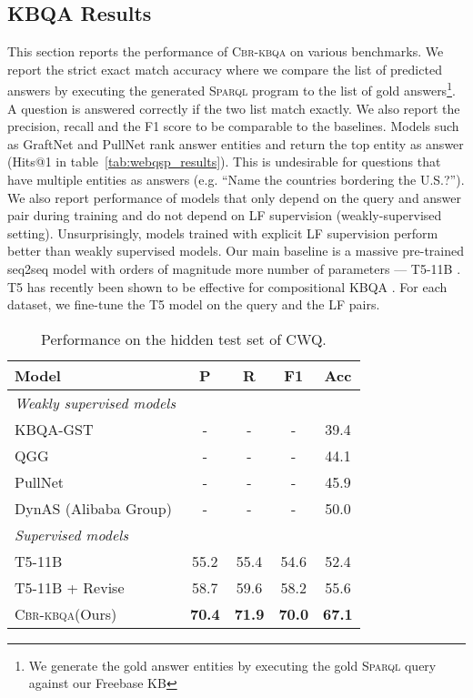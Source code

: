 \documentclass[11pt]{article}
\newcommand{\spql}{\textsc{Sparql}\xspace}
\newcommand{\alg}{\textsc{Cbr-kbqa}\xspace}
\begin{document}
\subsection{KBQA Results}
\label{sub:main_results}
This section reports the performance of \alg on various benchmarks. We report the strict exact match accuracy where we compare the list of predicted answers by executing the generated \spql program to the list of gold answers\footnote{We generate the gold answer entities by executing the gold \spql query against our Freebase KB}. A question is answered correctly if the two list match exactly. We also report the precision, recall and the F1 score to be comparable to the baselines. Models such as GraftNet \cite{sun2018open} and PullNet \cite{sun2019pullnet} rank answer entities and return the top entity as answer (Hits@1 in table~\ref{tab:webqsp_results}). This is undesirable for questions that have multiple entities as answers (e.g. ``Name the countries bordering the U.S.?''). We also report performance of models that only depend on the query and answer pair during training and do not depend on LF supervision (weakly-supervised setting). Unsurprisingly, models trained with explicit LF supervision perform better than weakly supervised models. Our main baseline is a massive pre-trained seq2seq model with orders of magnitude more number of parameters --- T5-11B \cite{t5}. T5 has recently been shown to be effective for compositional KBQA \cite{furrer2020compositional}. For each dataset, we fine-tune the T5 model on the query and the LF pairs. 

\begin{table}[t]
\centering
\footnotesize
\setlength{\tabcolsep}{4pt}
\begin{tabular}{@{}l c c c c@{}}
\toprule
Model & P & R & F1 & Acc \\
\midrule
\textit{Weakly supervised models} & & & & \\\midrule
KBQA-GST \cite{lan2019knowledge} & - & - & - & 39.4\\
QGG  \cite{lan2020query} & - & - & - & 44.1 \\
PullNet \cite{sun2019pullnet}& - & - & - & 45.9 \\
DynAS (Alibaba Group) & - & - & - & 50.0 \\
\midrule
\textit{Supervised models} & & & & \\\midrule
T5-11B \cite{t5} & 55.2 & 55.4 & 54.6 & 52.4\\
T5-11B + Revise & 58.7 & 59.6& 58.2& 55.6\\
\alg (Ours) & \textbf{70.4} & \textbf{71.9} & \textbf{70.0} & \textbf{67.1} \\
\bottomrule
\end{tabular}
\caption{Performance on the hidden test set of CWQ.} 
\label{tab:cwq_results}
\end{table}
\end{document}
